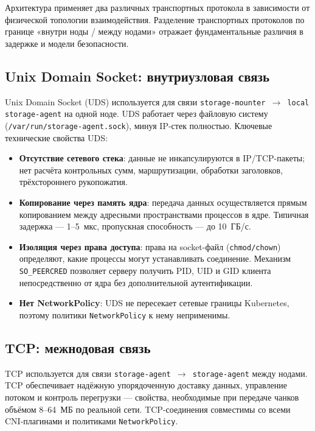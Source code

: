 Архитектура применяет два различных транспортных протокола в зависимости от физической топологии взаимодействия. Разделение транспортных протоколов по границе «внутри ноды / между нодами» отражает фундаментальные различия в задержке и модели безопасности.

\subsection*{Unix Domain Socket: внутриузловая связь}

Unix Domain Socket (UDS) используется для связи \texttt{storage-mounter $\to$ local storage-agent} на одной ноде. UDS работает через файловую систему (\texttt{/var/run/storage-agent.sock}), минуя IP-стек полностью. Ключевые технические свойства UDS:

\begin{itemize}[leftmargin=*]
  \item \textbf{Отсутствие сетевого стека}: данные не инкапсулируются в IP/TCP-пакеты; нет расчёта контрольных сумм, маршрутизации, обработки заголовков, трёхстороннего рукопожатия.
  \item \textbf{Копирование через память ядра}: передача данных осуществляется прямым копированием между адресными пространствами процессов в ядре. Типичная задержка --- 1--5~мкс, пропускная способность --- до 10~ГБ/с.
  \item \textbf{Изоляция через права доступа}: права на socket-файл (\texttt{chmod/chown}) определяют, какие процессы могут устанавливать соединение. Механизм \texttt{SO\_PEERCRED} позволяет серверу получить PID, UID и GID клиента непосредственно от ядра без дополнительной аутентификации.
  \item \textbf{Нет NetworkPolicy}: UDS не пересекает сетевые границы Kubernetes, поэтому политики \texttt{NetworkPolicy} к нему неприменимы.
\end{itemize}

\subsection*{TCP: межнодовая связь}

TCP используется для связи \texttt{storage-agent $\to$ storage-agent} между нодами. TCP обеспечивает надёжную упорядоченную доставку данных, управление потоком и контроль перегрузки --- свойства, необходимые при передаче чанков объёмом 8--64~МБ по реальной сети. TCP-соединения совместимы со всеми CNI-плагинами и политиками \texttt{NetworkPolicy}.

